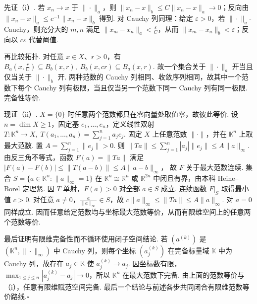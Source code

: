\begin{FAProof}
先证（i）. 若 \(\displaystyle x_n\to x\) 于 \(\displaystyle \|\cdot\|_a\)，则 \(\displaystyle \|x_n-x\|_b\leqslant C\|x_n-x\|_a\to0\)；反向由 \(\displaystyle \|x_n-x\|_a\leqslant c^{-1}\|x_n-x\|_b\) 得到. 对 Cauchy 列同理：给定 \(\displaystyle \varepsilon>0\)，若 \(\displaystyle \|\cdot\|_a\)-Cauchy，则充分大的 \(\displaystyle m,n\) 满足 \(\displaystyle \|x_m-x_n\|_a<\frac{\varepsilon}{C}\)，从而 \(\displaystyle \|x_m-x_n\|_b<\varepsilon\)；反向以 \(\displaystyle c\varepsilon\) 代替阈值.

再比较拓扑. 对任意 \(\displaystyle x\in X\)、\(\displaystyle r>0\)，有 \(\displaystyle B_a(x,\frac{r}{C})\subseteq B_b(x,r), \; B_b(x,cr)\subseteq B_a(x,r)\).
故一个集合关于 \(\displaystyle \|\cdot\|_a\) 开当且仅当关于 \(\displaystyle \|\cdot\|_b\) 开. 两种范数的 Cauchy 列相同、收敛序列相同，故其中一个范数下每个 Cauchy 列有极限，当且仅当另一个范数下同一 Cauchy 列有同一极限. 完备性等价.

现证（ii）. \(\displaystyle X=\{0\}\) 时任意两个范数都只在零向量处取值零，故彼此等价. 设 \(\displaystyle n=\dim X\geqslant1\)，固定基 \(\displaystyle e_1,\dots,e_n\)，定义线性双射 \(\displaystyle T:\mathbb K^n\to X, \; T(a_1,\dots,a_n)=\sum_{j=1}^{n}a_je_j\).
固定 \(\displaystyle X\) 上任意范数 \(\displaystyle \|\cdot\|\)，并在 \(\displaystyle \mathbb K^n\) 上取最大范数. 置 \(\displaystyle A=\sum_{j=1}^{n}\|e_j\|>0\). 则 \(\displaystyle \|Ta\| \leqslant\sum_{j=1}^{n}|a_j|\|e_j\| \leqslant A\|a\|_\infty\).
由反三角不等式，函数 \(\displaystyle F(a)=\|Ta\|\) 满足 \(\displaystyle |F(a)-F(b)|\leqslant\|T(a-b)\|\leqslant A\|a-b\|_\infty\)，
故 \(\displaystyle F\) 关于最大范数连续. 集合 \(\displaystyle S=\{a\in\mathbb K^n:\|a\|_\infty=1\}\) 在 \(\displaystyle \mathbb K^n\cong\mathbb R^n\) 或 \(\displaystyle \mathbb R^{2n}\) 中闭且有界，由本科 Heine--Borel 定理紧. 因 \(\displaystyle T\) 单射，\(\displaystyle F(a)>0\) 对全部 \(\displaystyle a\in S\) 成立. 连续函数 \(\displaystyle F|_S\) 取得最小值 \(\displaystyle c>0\). 对任意 \(\displaystyle a\neq0\)，\(\displaystyle \frac{a}{\|a\|_\infty}\in S\)，故
\(\displaystyle c\|a\|_\infty\leqslant\|Ta\|\leqslant A\|a\|_\infty\).
对 \(\displaystyle a=0\) 同样成立. 因而任意给定范数均与坐标最大范数等价，从而有限维空间上的任意两个范数等价.

最后证明有限维完备性而不循环使用闭子空间结论. 若 \(\displaystyle (a^{(k)})\) 是 \(\displaystyle (\mathbb K^n,\|\cdot\|_\infty)\) 中 Cauchy 列，则每个坐标 \(\displaystyle (a_j^{(k)})\) 在完备标量域 \(\displaystyle \mathbb K\) 中为 Cauchy 列，故存在 \(\displaystyle a_j\in\mathbb K\) 使 \(\displaystyle a_j^{(k)}\to a_j\). 因坐标数有限，\(\displaystyle \max_{1\leqslant j\leqslant n}|a_j^{(k)}-a_j|\to0\)，所以 \(\displaystyle \mathbb K^n\) 在最大范数下完备. 由上面的范数等价与（i），任意有限维赋范空间完备.
最后一个结论与前述各步共同闭合有限维范数等价路线.\hfill\(\square\)
\end{FAProof}

